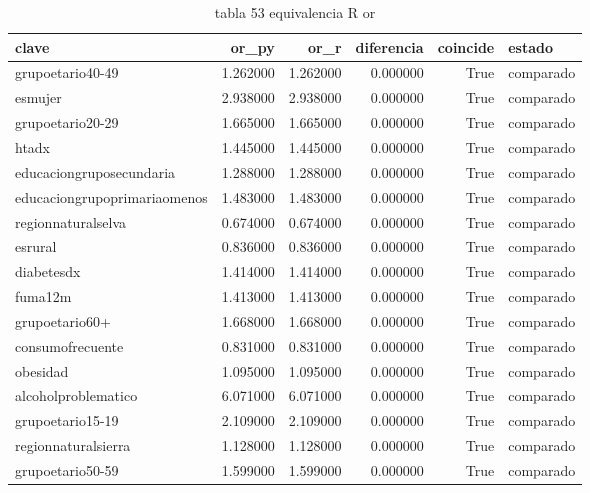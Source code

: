 \begin{table}[htbp]
\caption{tabla 53 equivalencia R or}
\label{tab:tabla_53_equivalencia_R_or}
\begin{tabular}{lrrrrl}
\toprule
clave & or\_py & or\_r & diferencia & coincide & estado \\
\midrule
grupoetario40-49 & 1.262000 & 1.262000 & 0.000000 & True & comparado \\
esmujer & 2.938000 & 2.938000 & 0.000000 & True & comparado \\
grupoetario20-29 & 1.665000 & 1.665000 & 0.000000 & True & comparado \\
htadx & 1.445000 & 1.445000 & 0.000000 & True & comparado \\
educaciongruposecundaria & 1.288000 & 1.288000 & 0.000000 & True & comparado \\
educaciongrupoprimariaomenos & 1.483000 & 1.483000 & 0.000000 & True & comparado \\
regionnaturalselva & 0.674000 & 0.674000 & 0.000000 & True & comparado \\
esrural & 0.836000 & 0.836000 & 0.000000 & True & comparado \\
diabetesdx & 1.414000 & 1.414000 & 0.000000 & True & comparado \\
fuma12m & 1.413000 & 1.413000 & 0.000000 & True & comparado \\
grupoetario60+ & 1.668000 & 1.668000 & 0.000000 & True & comparado \\
consumofrecuente & 0.831000 & 0.831000 & 0.000000 & True & comparado \\
obesidad & 1.095000 & 1.095000 & 0.000000 & True & comparado \\
alcoholproblematico & 6.071000 & 6.071000 & 0.000000 & True & comparado \\
grupoetario15-19 & 2.109000 & 2.109000 & 0.000000 & True & comparado \\
regionnaturalsierra & 1.128000 & 1.128000 & 0.000000 & True & comparado \\
grupoetario50-59 & 1.599000 & 1.599000 & 0.000000 & True & comparado \\
\bottomrule
\end{tabular}
\end{table}
